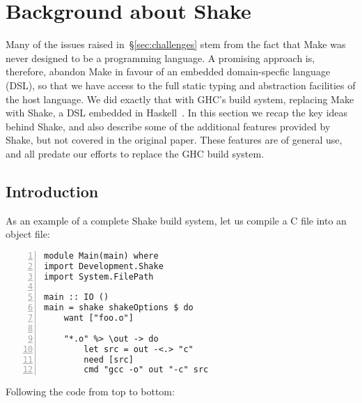 \section{Background about Shake\label{sec:shake}}

Many of the issues raised in~\S\ref{sec:challenges} stem from the fact
that Make was never designed to be a programming language.  A
promising approach is, therefore, abandon Make in favour of an
embedded domain-specfic language (DSL), so that we have access to the full
static typing and abstraction facilities of the host language.
We did exactly that with GHC's build system, replacing Make with
Shake, a DSL embedded in Haskell~\cite{shake}. In this section we
recap the key ideas behind Shake, and also describe some of the additional
features provided by Shake, but not covered in the original paper. These
features are of general use, and all predate our efforts to replace the GHC build
system.

\subsection{Introduction\label{sec:shake_intro}}

As an example of a complete
Shake build system, let us compile a C file into an object file:

\begin{lstlisting}[numbers=left,xleftmargin=2em,framexleftmargin=1.5em]
module Main(main) where
import Development.Shake
import System.FilePath

main :: IO ()
main = shake shakeOptions $ do
    want ["foo.o"]

    "*.o" %> \out -> do
        let src = out -<.> "c"
        need [src]
        cmd "gcc -o" out "-c" src
\end{lstlisting}

\noindent Following the code from top to bottom:

